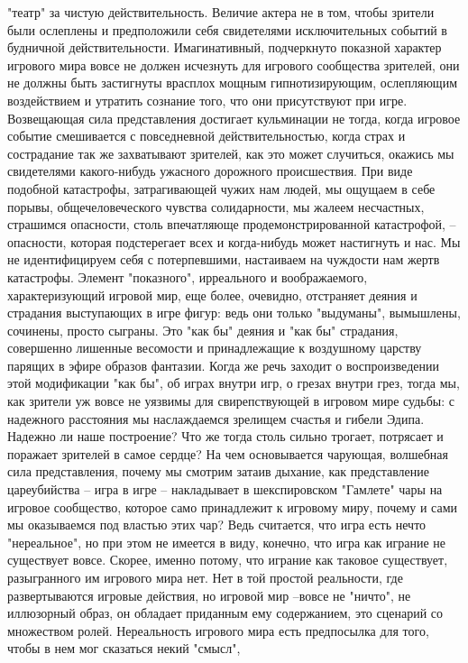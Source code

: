 \documentclass[12pt]{article}
\begin{document}
"театр" за чистую действительность. Величие актера не в том, чтобы зрители были ослеплены и предположили
себя  свидетелями  исключительных  событий  в  будничной  действительности.  Имагинативный,  подчеркнуто
показной характер игрового мира вовсе не должен исчезнуть для игрового сообщества зрителей, они не должны
быть застигнуты врасплох мощным гипнотизирующим, ослепляющим воздействием и утратить сознание того, 
что они присутствуют при игре. Возвещающая сила представления достигает кульминации не тогда, когда
игровое  событие  смешивается  с  повседневной  действительностью,  когда  страх  и  сострадание  так  же
захватывают зрителей, как это может случиться, окажись мы свидетелями какого-нибудь ужасного дорожного
происшествия. При виде подобной катастрофы, затрагивающей чужих нам людей, мы ощущаем в себе порывы,
общечеловеческого чувства солидарности, мы жалеем несчастных, страшимся опасности, столь впечатляюще
продемонстрированной катастрофой, -- опасности, которая подстерегает всех и когда-нибудь может настигнуть
и нас. Мы не идентифицируем себя с потерпевшими, настаиваем на чуждости нам жертв катастрофы. Элемент
"показного", ирреального и воображаемого, характеризующий игровой мир, еще более, очевидно, отстраняет
деяния и страдания выступающих в игре фигур: ведь они только "выдуманы", вымышлены, сочинены, просто
сыграны. Это "как бы" деяния и "как бы" страдания, совершенно лишенные весомости и принадлежащие к
воздушному  царству  парящих  в  эфире  образов  фантазии.  Когда  же  речь  заходит  о  воспроизведении  этой
модификации "как бы", об играх внутри игр, о грезах внутри грез, тогда мы, как зрители уж вовсе не уязвимы
для свирепствующей в игровом мире судьбы: с надежного расстояния мы наслаждаемся зрелищем счастья и
гибели Эдипа. Надежно ли наше построение? Что же тогда столь сильно трогает, потрясает и поражает зрителей
в самое сердце? На чем основывается чарующая, волшебная сила представления, почему мы смотрим затаив
дыхание, как представление цареубийства -- игра в игре -- накладывает в шекспировском "Гамлете" чары на
игровое сообщество, которое само принадлежит к игровому миру, почему и сами мы оказываемся под властью
этих чар? Ведь считается, что игра есть нечто "нереальное", но при этом не имеется в виду, конечно, что игра
как играние не существует вовсе. Скорее, именно потому, что играние как таковое существует, разыгранного им
игрового мира нет. Нет в той простой реальности, где развертываются игровые действия, но игровой мир --вовсе не "ничто", не иллюзорный образ, он обладает приданным ему содержанием, это сценарий со множеством
ролей. Нереальность игрового мира есть предпосылка для того, чтобы в нем мог сказаться некий "смысл",
\end{document}
